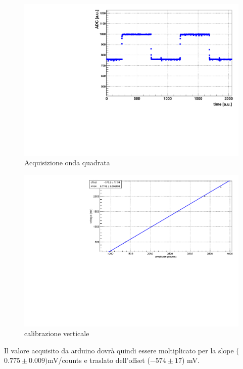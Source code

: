 \documentclass{article}
\begin{document}
\begin{center}
\begin{figure}[H]
\centering
\includegraphics[scale=0.4, angle=0]{4_2.pdf}
\caption{Acquisizione onda quadrata}
\label{fig:voltage_counts}
\end{figure}
\end{center}

\begin{center}
\begin{figure}[H]
\centering
\includegraphics[scale=0.4, angle=0]{calibverticale.pdf}
\caption{calibrazione verticale}
\label{fig:calibtempi}
\end{figure}
\end{center}

Il valore acquisito da arduino dovrà quindi essere moltiplicato per la slope ($0.775 \pm 0.009)$mV/counts
e traslato dell'offset ($-574 \pm 17$) mV.
\end{document}
